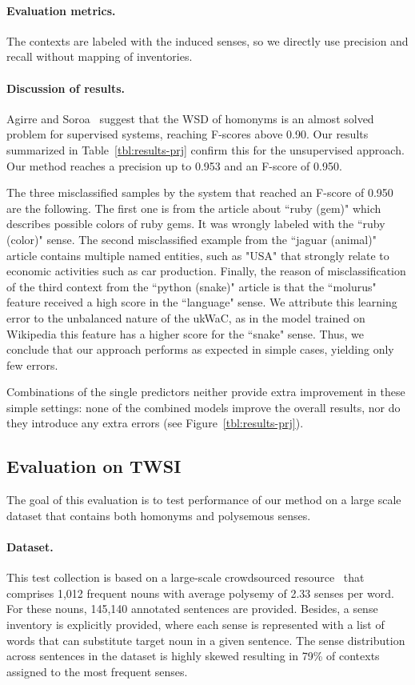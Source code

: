 \documentclass[11pt]{article}
\begin{document}
\paragraph{Evaluation metrics.} The contexts are labeled  with the induced senses, so we directly use precision and recall without mapping of inventories.  

\paragraph{Discussion of results.} Agirre and Soroa~ suggest that the WSD of homonyms is an almost solved problem for supervised systems, reaching F-scores above 0.90. Our results summarized in Table~\ref{tbl:results-prj} confirm this for the unsupervised approach. Our method reaches a precision up to 0.953  and an F-score of 0.950. 

The three misclassified samples by the system that reached an F-score of 0.950 are the following. The first one is from the article about ``ruby (gem)" which describes possible colors of ruby gems. It was wrongly labeled with the ``ruby (color)" sense. The second misclassified example from the ``jaguar (animal)" article contains multiple named entities, such as "USA" that strongly relate to economic activities such as car production. Finally, the reason of  misclassification of the third context from the ``python (snake)" article is that the ``molurus" feature received a high score in the ``language" sense. We attribute this learning error to the unbalanced nature of the ukWaC, as in the model trained on Wikipedia this feature has a higher score for the ``snake" sense. Thus, we conclude that our approach performs as expected in simple cases, yielding only few errors. 

Combinations of the single predictors neither provide extra improvement in these simple settings: none of the combined models improve the overall results, nor do they introduce any extra errors (see Figure~\ref{tbl:results-prj}). 


\subsection{Evaluation on TWSI}

The goal of this evaluation is to test performance of our method on a large scale dataset that contains both homonyms and polysemous senses. 

\paragraph{Dataset.} This test collection is based on a large-scale crowdsourced resource~\cite{Biemann2012} that comprises 1,012 frequent nouns with average polysemy of 2.33 senses per word. For these nouns, 145,140 annotated sentences are provided. Besides, a sense inventory is explicitly provided, where each sense is represented with a list of words that can substitute target noun in a given sentence. The sense distribution across sentences in the dataset is highly skewed resulting in 79\% of contexts assigned to the most frequent senses. 
\end{document}
